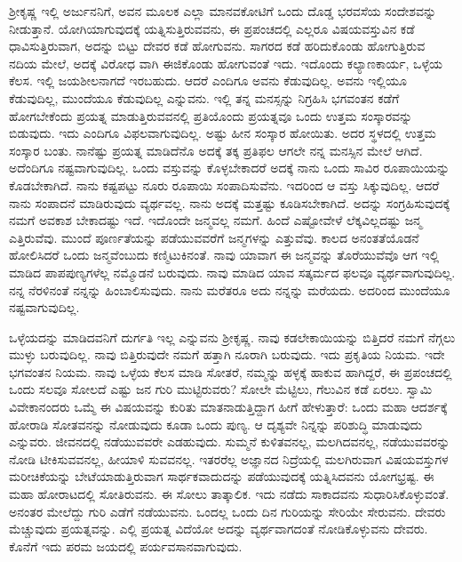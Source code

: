 ಶ‍್ರೀಕೃಷ್ಣ ಇಲ್ಲಿ ಅರ್ಜುನನಿಗೆ, ಅವನ ಮೂಲಕ ಎಲ್ಲಾ ಮಾನವಕೋಟಿಗೆ ಒಂದು ದೊಡ್ಡ ಭರವಸೆಯ ಸಂದೇಶವನ್ನು ನೀಡುತ್ತಾನೆ. ಯೋಗಿಯಾಗುವುದಕ್ಕೆ ಯತ್ನಿಸುತ್ತಿರುವವನು, ಈ ಪ್ರಪಂಚದಲ್ಲಿ ಎಲ್ಲರೂ ವಿಷಯವಸ್ತುವಿನ ಕಡೆ ಧಾವಿಸುತ್ತಿರುವಾಗ, ಅದನ್ನು ಬಿಟ್ಟು ದೇವರ ಕಡೆ ಹೋಗುವನು. ಸಾಗರದ ಕಡೆ ಹರಿದುಕೊಂಡು ಹೋಗುತ್ತಿರುವ ನದಿಯ ಮೇಲೆ, ಅದಕ್ಕೆ ವಿರೋಧ ವಾಗಿ ಈಜಿಕೊಂಡು ಹೋಗುವಂತೆ ಇದು. ಇದೊಂದು ಕಲ್ಯಾಣಕಾರ್ಯ, ಒಳ್ಳೆಯ ಕೆಲಸ. ಇಲ್ಲಿ ಜಯಶೀಲನಾಗದೆ ಇರಬಹುದು. ಆದರೆ ಎಂದಿಗೂ ಅವನು ಕೆಡುವುದಿಲ್ಲ. ಅವನು ಇಲ್ಲಿಯೂ ಕೆಡುವುದಿಲ್ಲ, ಮುಂದೆಯೂ ಕೆಡುವುದಿಲ್ಲ ಎನ್ನುವನು. ಇಲ್ಲಿ ತನ್ನ ಮನಸ್ಸನ್ನು ನಿಗ್ರಹಿಸಿ ಭಗವಂತನ ಕಡೆಗೆ ಹೋಗಬೇಕೆಂದು ಪ್ರಯತ್ನ ಮಾಡುತ್ತಿರುವವನಲ್ಲಿ ಪ್ರತಿಯೊಂದು ಪ್ರಯತ್ನವೂ ಒಂದು ಉತ್ತಮ ಸಂಸ್ಕಾರವನ್ನು ಬಿಡುವುದು. ಇದು ಎಂದಿಗೂ ವಿಫಲವಾಗುವುದಿಲ್ಲ. ಅಷ್ಟು ಹೀನ ಸಂಸ್ಕಾರ ಹೋಯಿತು. ಅದರ ಸ್ಥಳದಲ್ಲಿ ಉತ್ತಮ ಸಂಸ್ಕಾರ ಬಂತು. ನಾನೆಷ್ಟು ಪ್ರಯತ್ನ ಮಾಡಿದೆನೊ ಅದಕ್ಕೆ ತಕ್ಕ ಪ್ರತಿಫಲ ಆಗಲೇ ನನ್ನ ಮನಸ್ಸಿನ ಮೇಲೆ ಆಗಿದೆ. ಅದೆಂದಿಗೂ ನಷ್ಟವಾಗುವುದಿಲ್ಲ. ಒಂದು ವಸ್ತುವನ್ನು ಕೊಳ್ಳಬೇಕಾದರೆ ಅದಕ್ಕೆ ನಾನು ಒಂದು ಸಾವಿರ ರೂಪಾಯಿಯನ್ನು ಕೊಡಬೇಕಾಗಿದೆ. ನಾನು ಕಷ್ಟಪಟ್ಟು ನೂರು ರೂಪಾಯಿ ಸಂಪಾದಿಸುವೆನು. ಇದರಿಂದ ಆ ವಸ್ತು ಸಿಕ್ಕುವುದಿಲ್ಲ. ಆದರೆ ನಾನು ಸಂಪಾದನೆ ಮಾಡಿರುವುದು ವ್ಯರ್ಥವಲ್ಲ. ನಾನು ಅದಕ್ಕೆ ಮತ್ತಷ್ಟು ಕೂಡಿಸಬೇಕಾಗಿದೆ. ಅದನ್ನು ಸಂಗ್ರಹಿಸುವುದಕ್ಕೆ ನಮಗೆ ಅವಕಾಶ ಬೇಕಾದಷ್ಟು ಇದೆ. ಇದೊಂದೇ ಜನ್ಮವಲ್ಲ ನಮಗೆ. ಹಿಂದೆ ಎಷ್ಟೋವೇಳೆ ಲೆಕ್ಕವಿಲ್ಲದಷ್ಟು ಜನ್ಮ ಎತ್ತಿರುವೆವು. ಮುಂದೆ ಪೂರ್ಣತೆಯನ್ನು ಪಡೆಯುವವರೆಗೆ ಜನ್ಮಗಳನ್ನು ಎತ್ತುವೆವು. ಕಾಲದ ಅನಂತತೆಯೊಡನೆ ಹೋಲಿಸಿದರೆ ಒಂದು ಜನ್ಮವೆಂಬುದು ಕಣ್ಮಿಟುಕಿನಂತೆ. ನಾವು ಯಾವಾಗ ಈ ಜನ್ಮವನ್ನು ತೊರೆಯುವೆವೊ ಆಗ ಇಲ್ಲಿ ಮಾಡಿದ ಪಾಪಪುಣ್ಯಗಳೆಲ್ಲ ನಮ್ಮೊಡನೆ ಬರುವುದು. ನಾವು ಮಾಡಿದ ಯಾವ ಸತ್ಕರ್ಮದ ಫಲವೂ ವ್ಯರ್ಥವಾಗುವುದಿಲ್ಲ. ನನ್ನ ನೆರಳಿನಂತೆ ನನ್ನನ್ನು ಹಿಂಬಾಲಿಸುವುದು. ನಾನು ಮರೆತರೂ ಅದು ನನ್ನನ್ನು ಮರೆಯದು. ಅದರಿಂದ ಮುಂದೆಯೂ ನಷ್ಟವಾಗುವುದಿಲ್ಲ.

ಒಳ್ಳೆಯದನ್ನು ಮಾಡಿದವನಿಗೆ ದುರ್ಗತಿ ಇಲ್ಲ ಎನ್ನುವನು ಶ‍್ರೀಕೃಷ್ಣ. ನಾವು ಕಡಲೇಕಾಯಿಯನ್ನು ಬಿತ್ತಿದರೆ ನಮಗೆ ನೆಗ್ಗಲು ಮುಳ್ಳು ಬರುವುದಿಲ್ಲ. ನಾವು ಬಿತ್ತಿರುವುದೇ ನಮಗೆ ಹತ್ತಾಗಿ ನೂರಾಗಿ ಬರುವುದು. ಇದು ಪ್ರಕೃತಿಯ ನಿಯಮ. ಇದೇ ಭಗವಂತನ ನಿಯಮ. ನಾವು ಒಳ್ಳೆಯ ಕೆಲಸ ಮಾಡಿ ಸೋತರೆ, ನಮ್ಮನ್ನು ಹಳ್ಳಕ್ಕೆ ಹಾಕುವ ಹಾಗಿದ್ದರೆ, ಈ ಪ್ರಪಂಚದಲ್ಲಿ ಒಂದು ಸಲವೂ ಸೋಲದೆ ಎಷ್ಟು ಜನ ಗುರಿ ಮುಟ್ಟಿರುವರು? ಸೋಲೇ ಮೆಟ್ಟಿಲು, ಗೆಲುವಿನ ಕಡೆ ಏರಲು. ಸ್ವಾಮಿ ವಿವೇಕಾನಂದರು ಒಮ್ಮೆ ಈ ವಿಷಯವನ್ನು ಕುರಿತು ಮಾತನಾಡುತ್ತಿದ್ದಾಗ ಹೀಗೆ ಹೇಳುತ್ತಾರೆ: ಒಂದು ಮಹಾ ಆದರ್ಶಕ್ಕೆ ಹೋರಾಡಿ ಸೋತವನನ್ನು ನೋಡುವುದು ಕೂಡಾ ಒಂದು ಪುಣ್ಯ. ಆ ದೃಶ್ಯವೇ ನಿನ್ನನ್ನು ಪರಿಶುದ್ಧಿ ಮಾಡುವುದು ಎನ್ನುವರು. ಜೀವನದಲ್ಲಿ ನಡೆಯುವವರೇ ಎಡಹುವುದು. ಸುಮ್ಮನೆ ಕುಳಿತವನಲ್ಲ, ಮಲಗಿದವನಲ್ಲ, ನಡೆಯುವವರನ್ನು ನೋಡಿ ಟೀಕಿಸುವವನಲ್ಲ, ಹೀಯಾಳಿ ಸುವವನಲ್ಲ. ಇತರರೆಲ್ಲ ಅಜ್ಞಾನದ ನಿದ್ರೆಯಲ್ಲಿ ಮಲಗಿರುವಾಗ ವಿಷಯವಸ್ತುಗಳ ಮರೀಚಿಕೆಯನ್ನು ಬೇಟೆಯಾಡುತ್ತಿರುವಾಗ ಸಾರ್ಥಕವಾದುದನ್ನು ಪಡೆಯುವುದಕ್ಕೆ ಯತ್ನಿಸಿದವನು ಯೋಗಭ್ರಷ್ಟ. ಈ ಮಹಾ ಹೋರಾಟದಲ್ಲಿ ಸೋತಿರುವನು. ಈ ಸೋಲು ತಾತ್ಕಾಲಿಕ. ಇದು ನಡೆದು ಸಾಕಾದವನು ಸುಧಾರಿಸಿಕೊಳ್ಳುವಂತೆ. ಅನಂತರ ಮೇಲೆದ್ದು ಗುರಿ ಎಡೆಗೆ ನಡೆಯುವನು. ಒಂದಲ್ಲ ಒಂದು ದಿನ ಗುರಿಯನ್ನು ಸೇರಿಯೇ ಸೇರುವನು. ದೇವರು ಮೆಚ್ಚುವುದು ಪ್ರಯತ್ನವನ್ನು. ಎಲ್ಲಿ ಪ್ರಯತ್ನ ವಿದೆಯೋ ಅದನ್ನು ವ್ಯರ್ಥವಾಗದಂತೆ ನೋಡಿಕೊಳ್ಳುವನು ದೇವರು. ಕೊನೆಗೆ ಇದು ಪರಮ ಜಯದಲ್ಲಿ ಪರ್ಯವಸಾನವಾಗುವುದು.

